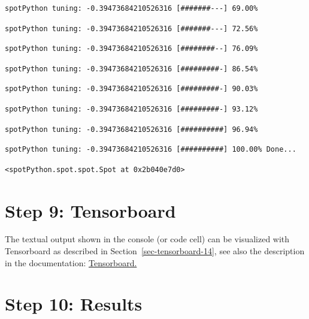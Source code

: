 \documentclass[
  letterpaper,
  DIV=11,
  numbers=noendperiod]{scrreprt}
\begin{document}
\begin{verbatim}
spotPython tuning: -0.39473684210526316 [#######---] 69.00% 
\end{verbatim}

\begin{verbatim}
spotPython tuning: -0.39473684210526316 [#######---] 72.56% 
\end{verbatim}

\begin{verbatim}
spotPython tuning: -0.39473684210526316 [########--] 76.09% 
\end{verbatim}

\begin{verbatim}
spotPython tuning: -0.39473684210526316 [#########-] 86.54% 
\end{verbatim}

\begin{verbatim}
spotPython tuning: -0.39473684210526316 [#########-] 90.03% 
\end{verbatim}

\begin{verbatim}
spotPython tuning: -0.39473684210526316 [#########-] 93.12% 
\end{verbatim}

\begin{verbatim}
spotPython tuning: -0.39473684210526316 [##########] 96.94% 
\end{verbatim}

\begin{verbatim}
spotPython tuning: -0.39473684210526316 [##########] 100.00% Done...
\end{verbatim}

\begin{verbatim}
<spotPython.spot.spot.Spot at 0x2b040e7d0>
\end{verbatim}

\hypertarget{sec-tensorboard-18}{%
\section{Step 9: Tensorboard}\label{sec-tensorboard-18}}

The textual output shown in the console (or code cell) can be visualized
with Tensorboard as described in Section~\ref{sec-tensorboard-14}, see
also the description in the documentation:
\href{https://sequential-parameter-optimization.github.io/spotPython/14_spot_ray_hpt_torch_cifar10.html\#sec-tensorboard-14}{Tensorboard.}

\hypertarget{sec-results-tuning-18}{%
\section{Step 10: Results}\label{sec-results-tuning-18}}
\end{document}

